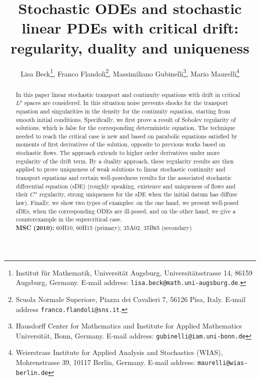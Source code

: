 \documentclass[a4paper,10pt]{article}
\newcommand\1{\mathbbm{1}}
\numberwithin{equation}{section}
\begin{document}
\title{Stochastic ODEs and stochastic linear PDEs with critical drift: regularity, duality and uniqueness}
\author{
  Lisa Beck\footnote{Institut f\"ur Mathematik, Universit\"at Augsburg, Universit\"atsstrasse 14, 86159 Augsburg, Germany. E-mail address: {\tt lisa.beck@math.uni-augsburg.de}.}, 
  Franco Flandoli\footnote{Scuola Normale Superiore, Piazza dei Cavalieri 7, 56126 Pisa, Italy. E-mail address {\tt franco.flandoli@sns.it}.}, 
  Massimiliano Gubinelli\footnote{Hausdorff Center for Mathematics and Institute for Applied Mathematics Universit\"at, Bonn, Germany. E-mail address: {\tt gubinelli@iam.uni-bonn.de}}, 
  Mario Maurelli\footnote{Weierstrass Institute for Applied Analysis and Stochastics (WIAS), Mohrenstrasse 39, 10117 Berlin, Germany. E-mail address: {\tt maurelli@wias-berlin.de}}}
\date{}
\maketitle

\begin{abstract}
In this paper linear stochastic transport and continuity equations with drift in critical $L^{p}$ spaces are considered. In this situation noise prevents shocks for the transport equation and singularities in the density for the continuity equation, starting from smooth initial conditions. Specifically, we first prove a result of Sobolev regularity of solutions, which is false for the corresponding deterministic equation. The technique needed to reach the critical case is new and based on parabolic equations satisfied by moments of first derivatives of the solution, opposite to previous works based on stochastic flows. The approach extends to higher order derivatives under more regularity of the drift term. By a duality approach, these regularity results are then applied to prove uniqueness of weak solutions to linear stochastic continuity and transport equations and certain well-posedness results for the associated stochastic differential equation (sDE) (roughly speaking, existence and uniqueness of flows and their $C^\alpha$ regularity, strong uniqueness for the sDE when the initial datum has diffuse law). Finally, we show two types of examples: on the one hand, we present well-posed sDEs, when the corresponding ODEs are ill-posed, and on the other hand, we give a counterexample in the supercritical case.
\\[1ex]
{\bf MSC (2010):} 60H10, 60H15 (primary); 35A02, 35B65 (secondary)
\end{abstract}
\end{document}
